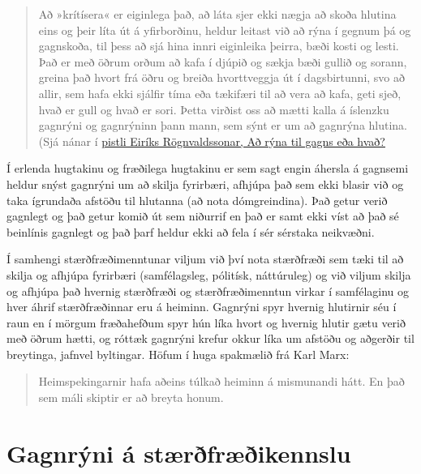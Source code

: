\documentclass[
  icelandic,
]{book}
\begin{document}
\begin{quote}
Að »krítísera« er eiginlega það, að láta sjer ekki nægja að skoða hlutina eins og þeir líta út á yfirborðinu, heldur leitast við að rýna í gegnum þá og gagnskoða, til þess að sjá hina innri eiginleika þeirra, bæði kosti og lesti. Það er með öðrum orðum að kafa í djúpið og sækja bæði gullið og sorann, greina það hvort frá öðru og breiða hvorttveggja út í dagsbirtunni, svo að allir, sem hafa ekki sjálfir tíma eða tækifæri til að vera að kafa, geti sjeð, hvað er gull og hvað er sori. Þetta virðist oss að mætti kalla á íslenzku gagnrýni og gagnrýninn þann mann, sem sýnt er um að gagnrýna hlutina. (Sjá nánar í \href{https://uni.hi.is/eirikur/2023/09/27/ad-ryna-til-gagns-eda-hvad/}{pistli Eiríks Rögnvaldssonar, Að rýna til gagns eða hvað?}
\end{quote}

Í erlenda hugtakinu og fræðilega hugtakinu er sem sagt engin áhersla á gagnsemi heldur snýst gagnrýni um að skilja fyrirbæri, afhjúpa það sem ekki blasir við og taka ígrundaða afstöðu til hlutanna (að nota dómgreindina). Það getur verið gagnlegt og það getur komið út sem niðurrif en það er samt ekki víst að það sé beinlínis gagnlegt og það þarf heldur ekki að fela í sér sérstaka neikvæðni.

Í samhengi stærðfræðimenntunar viljum við því nota stærðfræði sem tæki til að skilja og afhjúpa fyrirbæri (samfélagsleg, pólitísk, náttúruleg) og við viljum skilja og afhjúpa það hvernig stærðfræði og stærðfræðimenntun virkar í samfélaginu og hver áhrif stærðfræðinnar eru á heiminn. Gagnrýni spyr hvernig hlutirnir séu í raun en í mörgum fræðahefðum spyr hún líka hvort og hvernig hlutir gætu verið með öðrum hætti, og róttæk gagnrýni krefur okkur líka um afstöðu og aðgerðir til breytinga, jafnvel byltingar. Höfum í huga spakmælið frá Karl Marx:

\begin{quote}
Heimspekingarnir hafa aðeins túlkað heiminn á mismunandi hátt. En það sem máli skiptir er að breyta honum.
\end{quote}

\section{Gagnrýni á stærðfræðikennslu}\label{gagnryni_kennslu}
\end{document}

